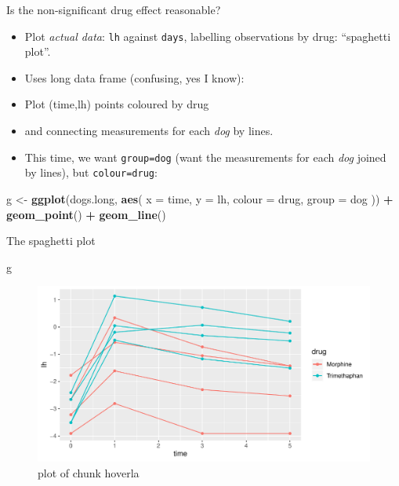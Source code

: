 \documentclass[ignorenonframetext,]{beamer}
\newenvironment{Shaded}{\begin{snugshade}}{\end{snugshade}}
\newcommand{\DataTypeTok}[1]{\textcolor[rgb]{0.13,0.29,0.53}{#1}}
\newcommand{\KeywordTok}[1]{\textcolor[rgb]{0.13,0.29,0.53}{\textbf{#1}}}
\newcommand{\NormalTok}[1]{#1}
\newcommand{\OperatorTok}[1]{\textcolor[rgb]{0.81,0.36,0.00}{\textbf{#1}}}
\newcommand{\StringTok}[1]{\textcolor[rgb]{0.31,0.60,0.02}{#1}}
\begin{document}
\begin{frame}[fragile]{Is the non-significant drug effect reasonable?}
\protect\hypertarget{is-the-non-significant-drug-effect-reasonable}{}

\begin{itemize}
\item
  Plot \emph{actual data}: \texttt{lh} against \texttt{days}, labelling
  observations by drug: ``spaghetti plot''.
\item
  Uses long data frame (confusing, yes I know):
\item
  Plot (time,lh) points coloured by drug
\item
  and connecting measurements for each \emph{dog} by lines.
\item
  This time, we want \texttt{group=dog} (want the measurements for each
  \emph{dog} joined by lines), but \texttt{colour=drug}:
\end{itemize}

\begin{Shaded}
\begin{Highlighting}[]
\NormalTok{g <-}\StringTok{ }\KeywordTok{ggplot}\NormalTok{(dogs.long, }\KeywordTok{aes}\NormalTok{(}
  \DataTypeTok{x =}\NormalTok{ time, }\DataTypeTok{y =}\NormalTok{ lh,}
  \DataTypeTok{colour =}\NormalTok{ drug, }\DataTypeTok{group =}\NormalTok{ dog}
\NormalTok{)) }\OperatorTok{+}
\StringTok{  }\KeywordTok{geom_point}\NormalTok{() }\OperatorTok{+}\StringTok{ }\KeywordTok{geom_line}\NormalTok{()}
\end{Highlighting}
\end{Shaded}

\end{frame}

\begin{frame}[fragile]{The spaghetti plot}
\protect\hypertarget{the-spaghetti-plot}{}

\begin{Shaded}
\begin{Highlighting}[]
\NormalTok{g}
\end{Highlighting}
\end{Shaded}

\begin{figure}
\centering
\includegraphics{figure/hoverla-1.pdf}
\caption{plot of chunk hoverla}
\end{figure}

\end{frame}
\end{document}
